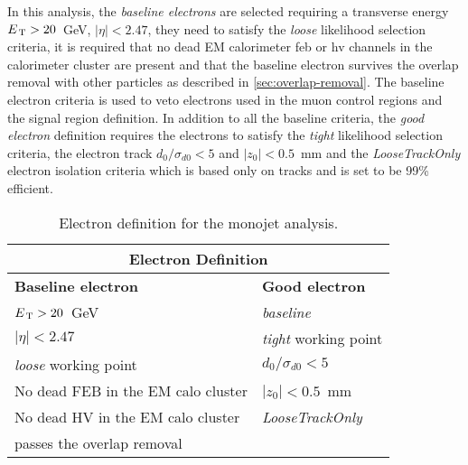 In this analysis, the \emph{baseline electrons} are selected requiring a
transverse energy $E_\mathrm{\, T} > 20$~GeV, $|\eta| < 2.47$, they need to satisfy the
\emph{loose} likelihood selection criteria, it is required that no dead EM
calorimeter \gls{feb} or \gls{hv} channels in the calorimeter cluster are
present and that the baseline electron survives the overlap removal with other
particles as described in \cref{sec:overlap-removal}. The baseline electron
criteria is used to veto electrons used in the muon control regions and the
signal region definition. In addition to all the baseline criteria, the
\emph{good electron} definition requires the electrons to satisfy the
\emph{tight} likelihood selection criteria, the electron track
$d_0 / \sigma_{d0} < 5$ and $|z_0| < 0.5$~mm and the \emph{LooseTrackOnly}
electron isolation criteria which is based only on tracks and is set to be 99\%
efficient.
\begin{table}[!th]
  \centering
  \begin{tabular}{ll}
    \toprule
    \multicolumn{2}{c}{Electron Definition} \\
    \midrule \midrule
    \textbf{Baseline electron} & \textbf{Good electron} \\
    \midrule
    $E_\mathrm{\, T} > 20$~GeV & \emph{baseline} \\
    $|\eta| < 2.47$ & \emph{tight} working point \\
    \emph{loose} working point & $d_0 / \sigma_{d0} < 5$ \\
    No dead FEB in the EM calo cluster & $|z_0| < 0.5$~mm \\
    No dead HV in the EM calo cluster & \emph{LooseTrackOnly} \\
    passes the overlap removal & \\
    \bottomrule
  \end{tabular}
  \caption{Electron definition for the monojet analysis.}
  \label{tab:ele_def}
\end{table}
